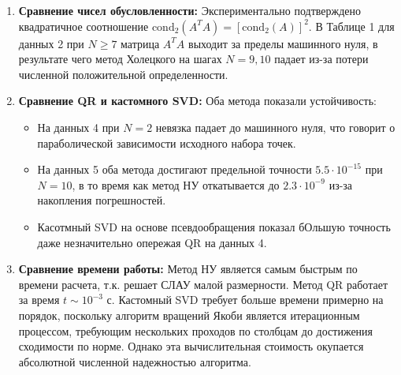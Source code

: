 \documentclass[a4paper,12pt]{article}
\begin{document}
	\begin{enumerate}
		\item \textbf{Сравнение чисел обусловленности:} Экспериментально подтверждено квадратичное соотношение $\text{cond}_2(A^T A) = [\text{cond}_2(A)]^2$. В Таблице 1 для данных 2 при $N \ge 7$ матрица $A^T A$ выходит за пределы машинного нуля, в результате чего метод Холецкого на шагах $N = 9, 10$ падает из-за потери численной положительной определенности. 
		
		\item \textbf{Сравнение QR и кастомного SVD:} 
		Оба метода показали устойчивость:
		\begin{itemize}
			\item На данных 4 при $N = 2$ невязка падает до машинного нуля, что говорит о параболической зависимости исходного набора точек.
			\item На данных 5 оба метода достигают предельной точности $5.5 \cdot 10^{-15}$ при $N = 10$, в то время как метод НУ откатывается до $2.3 \cdot 10^{-9}$ из-за накопления погрешностей.
			\item Касотмный SVD на основе псевдообращения показал бОльшую точность даже незначительно опережая QR на данных 4.
		\end{itemize}
		
		\item \textbf{Сравнение времени работы:} 
		Метод НУ является самым быстрым по времени расчета, т.к. решает СЛАУ малой размерности. Метод QR работает за время $t \sim 10^{-3}$ с. Кастомный SVD требует больше времени примерно на порядок, поскольку алгоритм вращений Якоби является итерационным процессом, требующим нескольких проходов по столбцам до достижения сходимости по норме. Однако эта вычислительная стоимость окупается абсолютной численной надежностью алгоритма.
	\end{enumerate}
	
\end{document}
